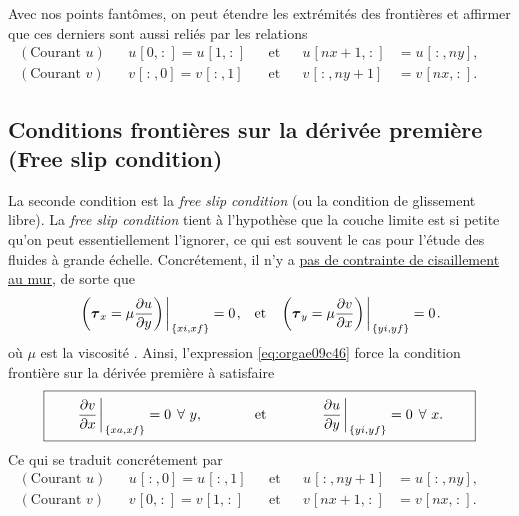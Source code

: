 \documentclass[10pt]{report}
\numberwithin{equation}{section}
\newcommand{\venti}{\vphantom{\sum_x^x}}
\newcommand{\pt}{\hspace{1pt}} %
\begin{document}
Avec nos points fantômes, on peut étendre les extrémités des frontières et affirmer que ces derniers sont aussi reliés par les relations
\begin{subequations}
\begin{align}
(\text{Courant }u) &&  u\pt[0,\pt:\pt] = u\pt[1,\pt:\pt] && \text{et} && u\pt[nx+1,\pt:\pt] &= u\pt[\pt:\pt,ny],&&\\
(\text{Courant }v) &&  v\pt[\pt:\pt,0] = v\pt[\pt:\pt,1] && \text{et} && v\pt[\pt:\pt,ny+1] &= v\pt[nx,\pt:\pt].&&
\end{align}
\end{subequations}

\subsection{Conditions frontières sur la dérivée première (Free slip condition)}
\label{sec:org59300eb}

La seconde condition est la \emph{free slip condition} (ou la condition de glissement libre).
La \emph{free slip condition} tient à l'hypothèse que la couche limite est si petite qu'on peut essentiellement l'ignorer, ce qui est souvent le cas pour l'étude des fluides à grande échelle.
Concrétement, il n'y a \href{https://physics.stackexchange.com/questions/383096/understanding-free-slip-boundary-condition\#:\~:text=On\%20the\%20other\%20hand\%2C\%20the,the\%20tangential\%20component\%20is\%20unrestricted.}{pas de contrainte de cisaillement au mur}, de sorte que
\begin{align}
\label{eq:orgae09c46}
&&\eval{\qty(\boldsymbol{\tau}_x = \mu \pdv{u}{y})\pt }_{\pt\{xi,xf\}} = 0\pt, && \text{et} &&
  \eval{\qty(\boldsymbol{\tau}_y = \mu \pdv{v}{x})\pt }_{\pt\{yi,yf\}} = 0\pt. &&
\end{align}
où \(\mu\) est la viscosité \autocite{tan2018applying}.
Ainsi, l'expression \ref{eq:orgae09c46} force la condition frontière sur la dérivée première à satisfaire 
\begin{equation}
\boxed{\hspace{0.7cm}\eval{\pdv{v}{x}\pt }_{\pt\{xa,xf\}} = 0\pt\ \forall\ y,\hspace{1.3cm} \text{et} \hspace{1.3cm} \eval{\pdv{u}{y}\pt }_{\pt \{yi,yf\}} = 0\pt\ \forall\ x.\hspace{0.7cm}\venti}
\end{equation}
Ce qui se traduit concrétement par
\begin{subequations}
\begin{align}
(\text{Courant }u) &&  u\pt[\pt:\pt,0] = u\pt[\pt:\pt,1] && \text{et} && u\pt[\pt:\pt,ny+1] &= u\pt[\pt:\pt,ny],&&\\
(\text{Courant }v) &&  v\pt[0,\pt:\pt] = v\pt[1,\pt:\pt] && \text{et} && v\pt[nx+1,\pt:\pt] &= v\pt[nx,\pt:\pt].&&
\end{align}
\end{subequations}
\end{document}

